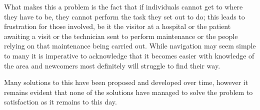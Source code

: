 What makes this a problem is the fact that if individuals cannot get to where they have to be, they cannot perform the task they set out to do; this leads to frustration for those involved, be it the visitor at a hospital or the patient awaiting a visit or the technician sent to perform maintenance or the people relying on that maintenance being carried out. While navigation may seem simple to many it is imperative to acknowledge that it becomes easier with knowledge of the area and newcomers most definitely will struggle to find their way.

Many solutions to this have been proposed and developed over time, however it remains evident that none of the solutions have managed to solve the problem to satisfaction as it remains to this day.
